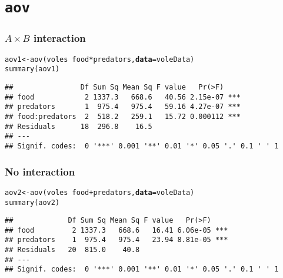 \documentclass[color=usenames,dvipsnames]{beamer}\usepackage[]{graphicx}\usepackage[]{color}
\makeatletter
\newcommand{\hlopt}[1]{\textcolor[rgb]{0,0,0}{#1}}%
\newcommand{\hlstd}[1]{\textcolor[rgb]{0,0,0}{#1}}%
\newcommand{\hlkwb}[1]{\textcolor[rgb]{0,0.341,0.682}{#1}}%
\newcommand{\hlkwc}[1]{\textcolor[rgb]{0,0,0}{\textbf{#1}}}%
\newcommand{\hlkwd}[1]{\textcolor[rgb]{0.004,0.004,0.506}{#1}}%
\newenvironment{kframe}{%
 \def\at@end@of@kframe{}%
 \ifinner\ifhmode%
  \def\at@end@of@kframe{\end{minipage}}%
  \begin{minipage}{\columnwidth}%
 \fi\fi%
 \def\FrameCommand##1{\hskip\@totalleftmargin \hskip-\fboxsep
 \colorbox{shadecolor}{##1}\hskip-\fboxsep
     \hskip-\linewidth \hskip-\@totalleftmargin \hskip\columnwidth}%
 \MakeFramed {\advance\hsize-\width
   \@totalleftmargin\z@ \linewidth\hsize
   \@setminipage}}%
 {\par\unskip\endMakeFramed%
 \at@end@of@kframe}
\newenvironment{knitrout}{}{} %
\makeatother
\begin{document}
\section{\tt aov}




\begin{frame}[fragile]
  \frametitle{$A \times B$ interaction}
  \small
\begin{knitrout}
\color{fgcolor}\begin{kframe}
\begin{alltt}
\hlstd{aov1} \hlkwb{<-} \hlkwd{aov}\hlstd{(voles} \hlopt{~} \hlstd{food} \hlopt{*} \hlstd{predators,} \hlkwc{data}\hlstd{=voleData)}
\hlkwd{summary}\hlstd{(aov1)}
\end{alltt}
\begin{verbatim}
##                Df Sum Sq Mean Sq F value   Pr(>F)    
## food            2 1337.3   668.6   40.56 2.15e-07 ***
## predators       1  975.4   975.4   59.16 4.27e-07 ***
## food:predators  2  518.2   259.1   15.72 0.000112 ***
## Residuals      18  296.8    16.5                     
## ---
## Signif. codes:  0 '***' 0.001 '**' 0.01 '*' 0.05 '.' 0.1 ' ' 1
\end{verbatim}
\end{kframe}
\end{knitrout}
\end{frame}







\begin{frame}[fragile]
  \frametitle{No interaction}
  \small
\begin{knitrout}
\color{fgcolor}\begin{kframe}
\begin{alltt}
\hlstd{aov2} \hlkwb{<-} \hlkwd{aov}\hlstd{(voles} \hlopt{~} \hlstd{food} \hlopt{+} \hlstd{predators,} \hlkwc{data}\hlstd{=voleData)}
\hlkwd{summary}\hlstd{(aov2)}
\end{alltt}
\begin{verbatim}
##             Df Sum Sq Mean Sq F value   Pr(>F)    
## food         2 1337.3   668.6   16.41 6.06e-05 ***
## predators    1  975.4   975.4   23.94 8.81e-05 ***
## Residuals   20  815.0    40.8                     
## ---
## Signif. codes:  0 '***' 0.001 '**' 0.01 '*' 0.05 '.' 0.1 ' ' 1
\end{verbatim}
\end{kframe}
\end{knitrout}
\end{frame}
\end{document}
